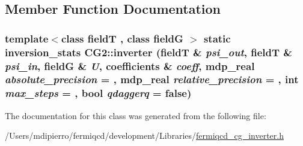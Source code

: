 \subsection{Member Function Documentation}
\hypertarget{class_c_g2_aa094cee6eb38b07eeddabb8175b1eb57}{
\subsubsection[{inverter}]{\setlength{\rightskip}{0pt plus 5cm}template$<$class fieldT , class fieldG $>$ static {\bf inversion\_\-stats} CG2::inverter (fieldT \& {\em psi\_\-out}, \/  fieldT \& {\em psi\_\-in}, \/  fieldG \& {\em U}, \/  {\bf coefficients} \& {\em coeff}, \/  {\bf mdp\_\-real} {\em absolute\_\-precision} = {}, \/  {\bf mdp\_\-real} {\em relative\_\-precision} = {}, \/  int {\em max\_\-steps} = {}, \/  bool {\em qdaggerq} = {\ttfamily false})}}
\label{class_c_g2_aa094cee6eb38b07eeddabb8175b1eb57}


The documentation for this class was generated from the following file:\begin{DoxyCompactItemize}
\item 
/Users/mdipierro/fermiqcd/development/Libraries/\hyperlink{fermiqcd__cg__inverter_8h}{fermiqcd\_\-cg\_\-inverter.h}\end{DoxyCompactItemize}
